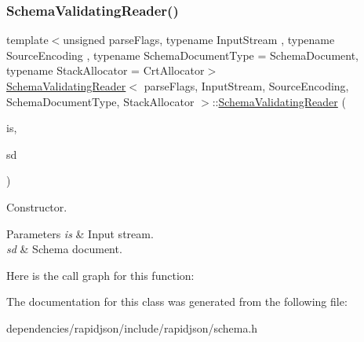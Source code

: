 \subsubsection{\texorpdfstring{Schema\+Validating\+Reader()}{SchemaValidatingReader()}}
{\footnotesize\ttfamily template$<$unsigned parse\+Flags, typename Input\+Stream , typename Source\+Encoding , typename Schema\+Document\+Type  = Schema\+Document, typename Stack\+Allocator  = Crt\+Allocator$>$ \\
\hyperlink{class_schema_validating_reader}{Schema\+Validating\+Reader}$<$ parse\+Flags, Input\+Stream, Source\+Encoding, Schema\+Document\+Type, Stack\+Allocator $>$\+::\hyperlink{class_schema_validating_reader}{Schema\+Validating\+Reader} (\begin{DoxyParamCaption}\item[{Input\+Stream \&}]{is,  }\item[{const Schema\+Document\+Type \&}]{sd }\end{DoxyParamCaption})\hspace{0.3cm}{\ttfamily [inline]}}



Constructor. 


\begin{DoxyParams}{Parameters}
{\em is} & Input stream. \\
\hline
{\em sd} & Schema document. \\
\hline
\end{DoxyParams}
Here is the call graph for this function\+:


The documentation for this class was generated from the following file\+:\begin{DoxyCompactItemize}
\item 
dependencies/rapidjson/include/rapidjson/schema.\+h\end{DoxyCompactItemize}
